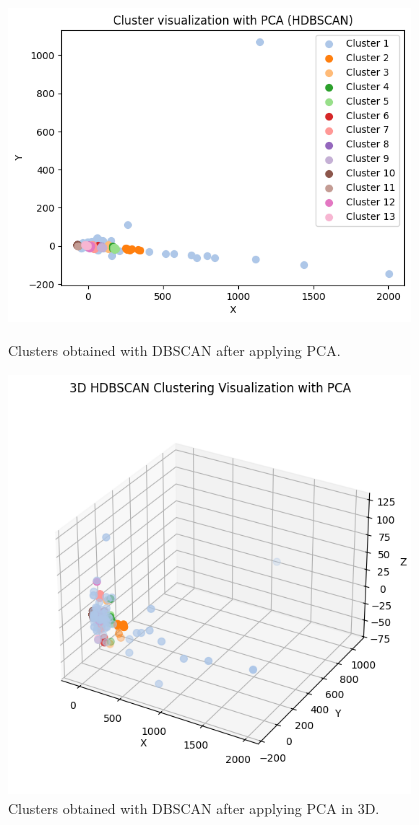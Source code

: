 \begin{figure}[H]
	\centering
	\begin{minipage}[t]{0.48\textwidth}
		\centering
		\includegraphics[width=0.95\textwidth]{../imgs/graphs/clustering/hdbscan_pca.png}
		\caption{Clusters obtained with DBSCAN after applying PCA.}
		\label{fig:clusters_hdbscan_pca}
	\end{minipage}\hfill
	\begin{minipage}[t]{0.48\textwidth}
		\centering
		\includegraphics[width=0.95\textwidth]{../imgs/graphs/clustering/hdbscan_pca_3d.png}
		\caption{Clusters obtained with DBSCAN after applying PCA in 3D.}
		\label{fig:clusters_hdbscan_pca_3d}
	\end{minipage}
\end{figure}

